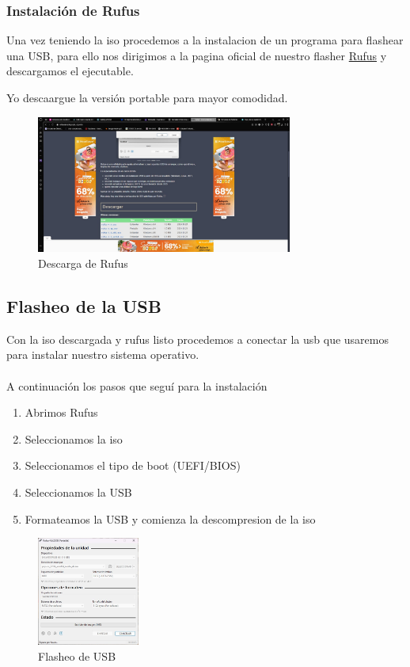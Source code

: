 \clearpage
\subsubsection{Instalación de Rufus}

Una vez teniendo la iso procedemos a la instalacion de un programa para flashear una USB, para ello nos dirigimos a la pagina oficial de nuestro flasher \href{https://rufus.ie/es/}{Rufus} y descargamos el ejecutable.

Yo descaargue la versión portable para mayor comodidad. 

\begin{figure}[h]
  \begin{center}
    \includegraphics[width=0.75\textwidth]{img/download_rufus.jpeg}
  \end{center}
  \caption{Descarga de Rufus}\label{fig:download_rufus}
\end{figure}


\subsection{Flasheo de la USB}

Con la iso descargada y rufus listo procedemos a conectar la usb que usaremos para instalar nuestro sistema operativo.
\\\\
A continuación los pasos que seguí para la instalación
\begin{enumerate}
  \item Abrimos Rufus
  \item Seleccionamos la iso
  \item Seleccionamos el tipo de boot (UEFI/BIOS)
  \item Seleccionamos la USB
  \item Formateamos la USB y comienza la descompresion de la iso
\end{enumerate}

\begin{figure}[h]
  \begin{center}
    \includegraphics[width=0.3\textwidth]{img/usb_boot.jpeg}
  \end{center}
  \caption{Flasheo de USB}\label{fig:usb_boot}
\end{figure}


